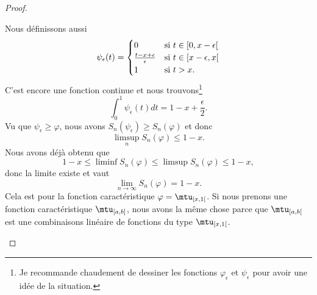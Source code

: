 \begin{proof}
\begin{subproof}
    Nous définissons aussi
    \begin{equation}
        \psi_{\epsilon}(t)=\begin{cases}
            0    &   \text{si \( t\in \mathopen[ 0 , x-\epsilon [\)}\\
            \frac{ t-x+\epsilon }{ \epsilon }    &   \text{si \( t\in\mathopen[ x-\epsilon , x [\)}\\
            1    &    \text{si \( t>x\)}.
        \end{cases}
    \end{equation}
    C'est encore une fonction continue et nous trouvons\footnote{Je recommande chaudement de dessiner les fonctions \( \varphi_{\epsilon}\) et \( \psi_{\epsilon}\) pour avoir une idée de la situation.}
    \begin{equation}
        \int_0^1\psi_{\epsilon}(t)dt=1-x+\frac{ \epsilon }{2}.
    \end{equation}
    Vu que \( \psi_{\epsilon}\geq\varphi\), nous avons \( S_n(\psi_{\epsilon})\geq S_n(\varphi)\) et donc
    \begin{equation}
        \limsup_{n}S_n(\varphi)\leq 1-x.
    \end{equation}
    Nous avons déjà obtenu que
    \begin{equation}
        1-x\leq\liminf S_n(\varphi)\leq \limsup S_n(\varphi)\leq 1-x,
    \end{equation}
    donc la limite existe et vaut
    \begin{equation}
        \lim_{n\to \infty} S_n(\varphi)=1-x.
    \end{equation}
    Cela est pour la fonction caractéristique \( \varphi=\mtu_{\mathopen[ x , 1 [}\). Si nous prenons une fonction caractéristique \( \mtu_{\mathopen[ a , b \mathclose]}\), nous avons la même chose parce que \( \mtu_{\mathopen[ a , b [}\) est une combinaisons linéaire de fonctions du type \( \mtu_{\mathopen[ x , 1 [}\).


\end{subproof}
\end{proof}

